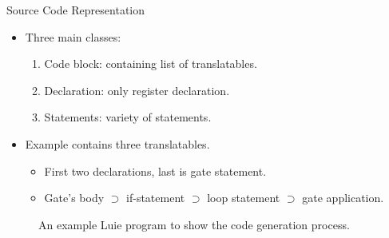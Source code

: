 \begin{frame}{Source Code Representation}
    \begin{minipage}{.60\textwidth}
        \begin{itemize}
            \item Three main classes:
            \begin{enumerate}
                \item Code block: containing list of translatables.
                \item Declaration: only register declaration.
                \item Statements: variety of statements.
            \end{enumerate}
            \item Example contains three translatables.
            \begin{itemize}
                \item First two declarations, last is gate statement.
                \item Gate's body $\supset$ if-statement $\supset$ loop statement $\supset$ gate application.
            \end{itemize}
        \end{itemize}   
        \vfill
        \begin{figure}
            \centering
            
            \caption{An example Luie program to show the code generation process.}
        \end{figure} 
    \end{minipage}
    \begin{minipage}{.35\textwidth}
        \centering
        \begin{figure}[htp]
            \centering

\end{figure}
\end{minipage}
\end{frame}
